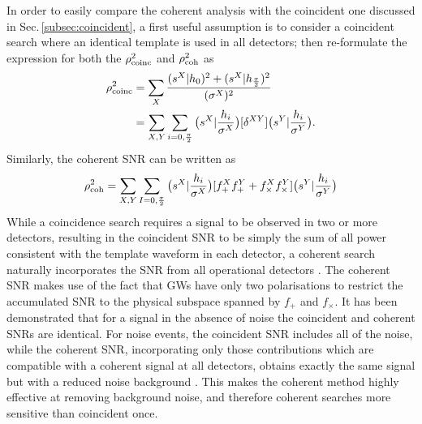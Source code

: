 \documentclass[binding=0.6cm, LaM]{sapthesis}
\begin{document}
	In order to easily compare the coherent analysis with the coincident one discussed in Sec.\,\ref{subsec:coincident},
	a  first useful assumption is to consider a coincident search where an identical template is used in all detectors;
	then re-formulate the expression for both the $\rho^2_{\rm coinc}$ and $\rho^2_{\rm coh}$ as
        \begin{align}
          \label{eq:rhocoinc}
          \rho^2_{\rm coinc} &= \sum_{X} {{(s^X|h_0)^2+(s^X|h_{{\pi}\over{2}})^2} \over {(\sigma^X)^2}}  \\
          &= \sum_{X,Y}\sum_{i=0,{{\pi}\over{2}}}  \big(s^X|{{h_i}\over{\sigma^X}}\big)[\delta^{XY}]\big( s^Y|{{h_i}\over{\sigma^Y}}\big).
        \end{align}
	Similarly, the coherent SNR can be written as
        \begin{equation}
          \label{eq:rhocoh}
          \rho^2_{\rm coh}  = \sum_{X,Y}\sum_{I=0,{{\pi}\over{2}}}  \big(s^X|{{h_i}\over{\sigma^X}}\big)[f_{+}^Xf_{+}^Y+f_{\times}^Xf_{\times}^Y]\big( s^Y|{{h_i}\over{\sigma^Y}}\big)
        \end{equation}
	While a coincidence search requires a signal to be observed in two or more detectors, 
        resulting in the coincident SNR to be simply the sum of all power consistent with the template waveform in each detector,
        a coherent search naturally incorporates the SNR from all operational detectors \cite{45, 46}.
	The coherent SNR makes use of the fact that GWs have only two polarisations 
	to restrict the accumulated SNR to the physical subspace spanned by $f_+$ and $f_{\times}$. 
	It has been demonstrated that for a signal in the absence of noise the coincident and coherent SNRs are identical. 
        For noise events, the coincident SNR includes all of the noise, 
        while the coherent SNR, incorporating only those contributions which are compatible 
        with a coherent signal at all detectors, obtains exactly the same signal but with a reduced noise background \cite{45}.
        This makes the coherent method highly effective at removing background noise, and therefore coherent searches more sensitive than coincident once.
\end{document}
